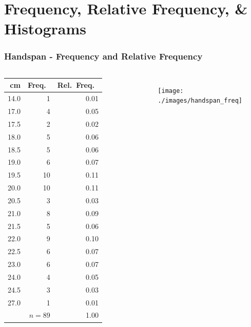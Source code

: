 \section{Frequency, Relative Frequency, \& Histograms}
\begin{frame}
\frametitle{Handspan - Frequency and Relative Frequency}
\footnotesize
\singlespacing


\begin{columns}
\begin{tabular}{rrr}
cm& Freq.\ & Rel.\ Freq.\ \\
\hline
14.0         & 1 &0.01\\
17.0         & 4 &0.05\\
17.5      &  2 &0.02\\
18.0         & 5 &0.06\\
18.5      &  5 &0.06\\
19.0         & 6 &0.07\\
19.5      & 10 &0.11\\
20.0        & 10 &0.11\\
20.5      &  3 &0.03\\
21.0         & 8 &0.09\\
21.5      &  5 &0.06\\
22.0         & 9 &0.10\\
22.5      &  6 &0.07\\
23.0         & 6 &0.07\\
24.0         & 4 &0.05\\
24.5      &  3 &0.03\\
27.0         & 1 &0.01\\
\hline
& $n=89$&1.00
\end{tabular}
\begin{figure}
	\centering
	\texttt{[image: ./images/handspan\_freq]}
\end{figure}
\end{columns}
\end{frame}
